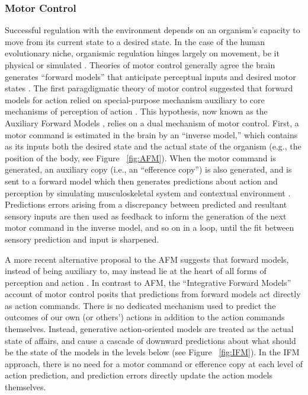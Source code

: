 \begin{CJK}{UTF8}{gbsn}
\subsubsection{Motor Control}
Successful regulation with the environment depends on an organism's capacity to move from its current state to a desired state.  In the case of the human evolutionary niche, organismic regulation hinges largely on movement, be it physical or simulated \citep{Wolpert1995}.  Theories of motor control generally agree the brain generates ``forward models'' that anticipate perceptual inputs and desired motor states \citep{Pickering2014}. The first paragdigmatic theory of motor control suggested that forward models for action relied on special-purpose mechanism auxiliary to core mechanisms of perception of action \citep{Wolpert1997}.  This hypothesis, now known as the Auxiliary Forward Models \citep[AFM, see][]{Pickering2014}, relies on a dual mechanism of motor control.  First, a motor command is estimated in the brain by an ``inverse model,'' which contains as its inputs both the desired state and the actual state of the organism (e.g., the position of the body, see Figure ~\ref{fig:AFM}).  When the motor command is generated, an auxiliary copy (i.e., an ``efference copy'') is also generated, and is sent to a forward model which then generates predictions about action and perception by simulating musculoskeletal system and contextual environment \citep{Wolpert1995,Blakemore1998,Flanagan2003}.  Predictions errors arising from a discrepancy between predicted and resultant sensory inputs are then used as feedback to inform the generation of the next motor command in the inverse model, and so on in a loop, until the fit between sensory prediction and input is sharpened.

A more recent alternative proposal to the AFM suggests that forward models, instead of being auxiliary to, may instead lie at the heart of all forms of perception and action \citep{Friston2010}.  In contrast to AFM, the ``Integrative Forward Models'' account of motor control \citep[IFM, see][]{Pickering2014} posits that predictions from forward models act directly as action commands.  There is no dedicated mechanism used to predict the outcomes of our own (or others’) actions in addition to the action commands themselves.  Instead, generative action-oriented models are treated as the actual state of affairs, and cause a cascade of downward predictions about what should be the state of the models in the levels below (see Figure ~\ref{fig:IFM}).  In the IFM approach, there is no need for a motor command or efference copy at each level of action prediction, and prediction errors directly update the action models themselves.





\end{CJK}
